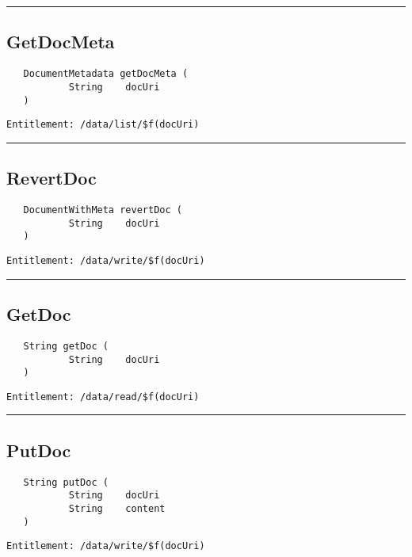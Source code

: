 \rule{12cm}{2pt}
\subsection{GetDocMeta}
\label{Api:GetDocMeta}
\begin{Verbatim}
   DocumentMetadata getDocMeta (
           String    docUri
   )
\end{Verbatim}
\begin{Verbatim}[formatcom=\color{Maroon}]
  Entitlement: /data/list/$f(docUri)
\end{Verbatim}



\rule{12cm}{2pt}
\subsection{RevertDoc}
\label{Api:RevertDoc}
\begin{Verbatim}
   DocumentWithMeta revertDoc (
           String    docUri
   )
\end{Verbatim}
\begin{Verbatim}[formatcom=\color{Maroon}]
  Entitlement: /data/write/$f(docUri)
\end{Verbatim}



\rule{12cm}{2pt}
\subsection{GetDoc}
\label{Api:GetDoc}
\begin{Verbatim}
   String getDoc (
           String    docUri
   )
\end{Verbatim}
\begin{Verbatim}[formatcom=\color{Maroon}]
  Entitlement: /data/read/$f(docUri)
\end{Verbatim}



\rule{12cm}{2pt}
\subsection{PutDoc}
\label{Api:PutDoc}
\begin{Verbatim}
   String putDoc (
           String    docUri
           String    content
   )
\end{Verbatim}
\begin{Verbatim}[formatcom=\color{Maroon}]
  Entitlement: /data/write/$f(docUri)
\end{Verbatim}



